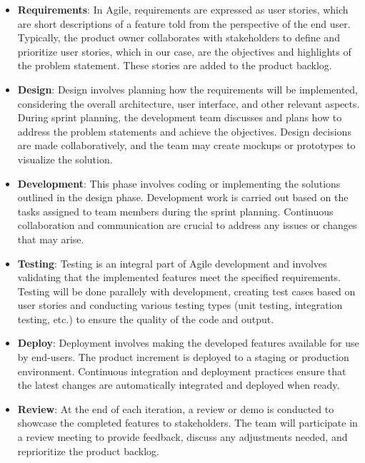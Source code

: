 \begin{itemize}

  \item \textbf{Requirements}:
        In Agile, requirements are expressed as user stories, which are short descriptions of a feature told from the perspective of the end user.
        Typically, the product owner collaborates with stakeholders to define and prioritize user stories, which in our case, are the objectives and highlights of the problem statement. These stories are added to the product backlog.

  \item \textbf{Design}:
        Design involves planning how the requirements will be implemented, considering the overall architecture, user interface, and other relevant aspects.
        During sprint planning, the development team discusses and plans how to address the problem statements and achieve the objectives. Design decisions are made collaboratively, and the team may create mockups or prototypes to visualize the solution.\\
  \item \textbf{Development}:
        This phase involves coding or implementing the solutions outlined in the design phase.
        Development work is carried out based on the tasks assigned to team members during the sprint planning. Continuous collaboration and communication are crucial to address any issues or changes that may arise.\\

  \item \textbf{Testing}:
        Testing is an integral part of Agile development and involves validating that the implemented features meet the specified requirements.
        Testing will be done parallely with development, creating test cases based on user stories and conducting various testing types (unit testing, integration testing, etc.) to ensure the quality of the code and output.\\

  \item \textbf{Deploy}:
        Deployment involves making the developed features available for use by end-users.
        The product increment is deployed to a staging or production environment. Continuous integration and deployment practices ensure that the latest changes are automatically integrated and deployed when ready.\\


  \item \textbf{Review}:
        At the end of each iteration, a review or demo is conducted to showcase the completed features to stakeholders.
        The team will participate in a review meeting to provide feedback, discuss any adjustments needed, and reprioritize the product backlog.\\


\end{itemize}
